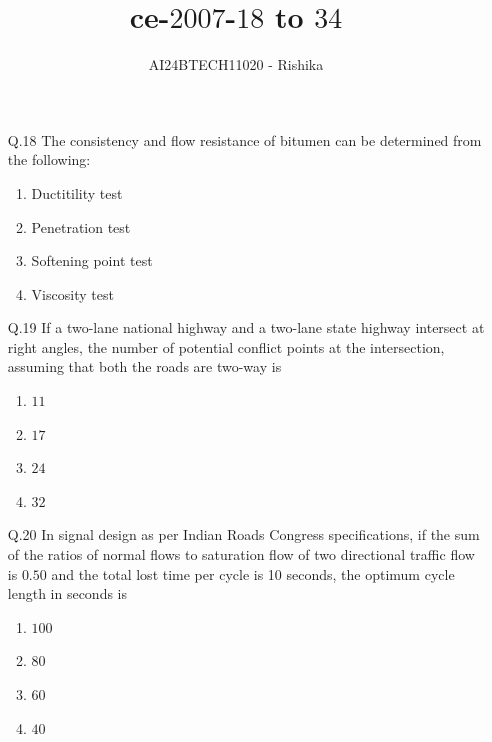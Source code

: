 \documentclass[journal,12pt,onecolumn]{IEEEtran}
\theoremstyle{remark}
\begin{document}

\vspace{3cm}

\title{ce-$2007$-$18$ to $34$}
\author{AI24BTECH11020 - Rishika}
\maketitle
\bigskip
\renewcommand{\thefigure}{\theenumi}
\renewcommand{\thetable}{\theenumi}
\begin{enumerate}
	\item[Q.18] The consistency and flow resistance of bitumen can be determined from the following:
	\begin{enumerate}
		\item Ductitility test
		\item Penetration test
		\item Softening point test
		\item Viscosity test
	\end{enumerate}
\item[Q.19] If a two-lane national highway and a two-lane state highway intersect at right angles, the number of potential conflict points at the intersection, assuming that both the roads are two-way is 
	\begin{enumerate}
                \item $11$
                \item $17$
		\item $24$
                \item $32$
        \end{enumerate}
\item[Q.20] In signal design as per Indian Roads Congress specifications, if the sum of the ratios of normal flows to saturation flow of two directional traffic flow is $0.50$ and the total lost time per cycle is 10 seconds, the optimum cycle length in seconds is 
	\begin{enumerate}
                \item $100$
                \item $80$
                \item $60$
                \item $40$
        \end{enumerate}

\end{enumerate}
\end{document}
